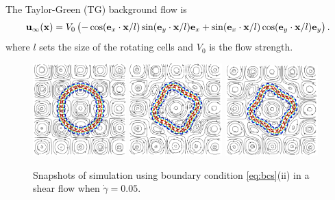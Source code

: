 \documentclass[aps,prl,preprint,groupedaddress]{revtex4-2}
\newcommand{\xx}{\mathbf{x}}
\newcommand{\uu}{\mathbf{u}}
\begin{document}
The Taylor-Green (TG) background flow is
\begin{equation}
  \uu_\infty(\xx) = V_0 \left(-\cos({\bf e}_x\cdot\xx/l)\sin({\bf e}_y\cdot\xx/l){\bf e}_x
  +\sin({\bf e}_x\cdot\xx/l)\cos({\bf e}_y\cdot\xx/l){\bf e}_y\right).
\end{equation}
where $l$ sets the size of the rotating cells and $V_0$ is the flow strength. 
%
\begin{figure}
  \begin{center}
  \includegraphics[width=0.32\textwidth]{vesTG_0.png}
  \includegraphics[width=0.32\textwidth]{vesTG_2500.png}
  \includegraphics[width=0.32\textwidth]{vesTG_5000.png} 
  \end{center}
  \vspace{-20pt}  
  \caption{\label{fig:shear_1} Snapshots of simulation using boundary condition \eqref{eq:bcs}(ii) in a shear flow when $\dot\gamma=0.05$. }
\end{figure}
\end{document}
